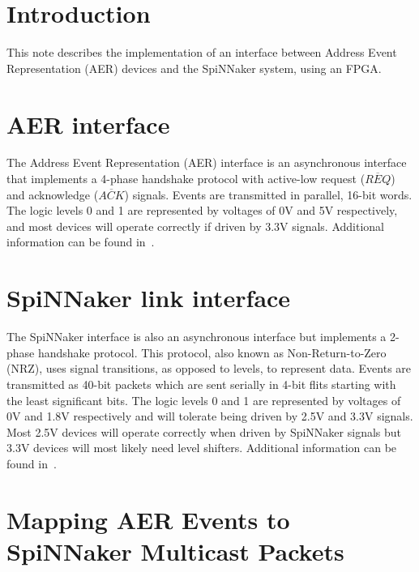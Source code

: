
\def\FullTitle{Interfacing AER devices to SpiNNaker\\ using an FPGA}
\def\ShortTitle{SpiNNaker - AER interface}
\def\Date{08 Mar 2017}
\def\Version{1.2}
\def\Author{Luis A. Plana}
\def\Email{luis.plana@manchester.ac.uk}



\section{Introduction}


This note describes the implementation of an interface between
Address Event Representation (AER) devices and the SpiNNaker system,
using an FPGA.


\section{AER interface}

The Address Event Representation (AER) interface is an asynchronous
interface that implements a 4-phase handshake protocol with active-low
request ($\overline{REQ}$) and acknowledge ($\overline{ACK}$)
signals. Events are transmitted in parallel, 16-bit words. The logic
levels 0 and 1 are represented by voltages of 0V and 5V respectively,
and most devices will operate correctly if driven by 3.3V
signals. Additional information can be found in~\cite{AER}.


\section{SpiNNaker link interface}

The SpiNNaker interface is also an asynchronous interface but
implements a 2-phase handshake protocol. This protocol, also known as
Non-Return-to-Zero (NRZ), uses signal transitions, as opposed to
levels, to represent data. Events are transmitted as 40-bit packets
which are sent serially in 4-bit flits starting with the least
significant bits. The logic levels 0 and 1 are represented by voltages
of 0V and 1.8V respectively and will tolerate being driven by 2.5V and
3.3V signals. Most 2.5V devices will operate correctly when driven by
SpiNNaker signals but 3.3V devices will most likely need level
shifters. Additional information can be found in~\cite{spinn-app-7}.


\section{Mapping AER Events to SpiNNaker Multicast Packets}



